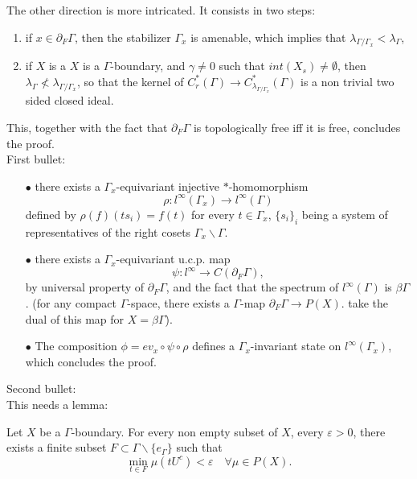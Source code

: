 The other direction is more intricated. It consists in two steps:\\
\begin{enumerate}
\item if $x\in \partial_F \Gamma$, then the stabilizer $\Gamma_x$ is amenable, which implies that $\lambda_{\Gamma/ \Gamma_x} <  \lambda_{\Gamma}$,\\
\item if $X$ is a $X$ is a $\Gamma$-boundary, and $\gamma\neq 0$ such that $int(X_s)\neq \emptyset$, then $\lambda_{\Gamma} \nless \lambda_{\Gamma/ \Gamma_x}  $, so that the kernel of $C^*_r(\Gamma)\rightarrow C^*_{\lambda_{\Gamma/ \Gamma_x}}(\Gamma)$ is a non trivial two sided closed ideal.\\
\end{enumerate}
This, together with the fact that $\partial_F\Gamma$ is topologically free iff it is free, concludes the proof.\\

First bullet: \\

\begin{itemize}
\item[$\bullet$] there exists a $\Gamma_x$-equivariant injective $*$-homomorphism
\[ \rho:  l^\infty (\Gamma_x ) \rightarrow l^\infty (\Gamma)\]
defined by $\rho(f)(ts_i)= f(t)$ for every $t\in\Gamma_x $, $\{s_i\}_i$ being a system of representatives of the right cosets $\Gamma_x \backslash \Gamma$.\\
\item[$\bullet$] there exists a $\Gamma_x$-equivariant u.c.p. map \[\psi : l^{\infty } \rightarrow C(\partial_F \Gamma),\] by universal property of $\partial_F \Gamma$, and the fact that the spectrum of $l^\infty(\Gamma)$ is $\beta \Gamma$. (for any compact $\Gamma$-space, there exists a $\Gamma$-map $\partial_F \Gamma \rightarrow P(X)$. take the dual of this map for $X = \beta \Gamma$).\\

\item[$\bullet$] The composition $\phi = ev_x \circ \psi \circ \rho$ defines a $\Gamma_x$-invariant state on $l^\infty(\Gamma_x)$, which concludes the proof.\\
\end{itemize}

Second bullet:\\

This needs a lemma:

\begin{lem} Let $X$ be a $\Gamma$-boundary.
For every non empty subset of $X$, every $\varepsilon >0$, there exists a finite subset $F\subset \Gamma \backslash \{e_\Gamma\}$ such that
\[ \min_{t\in F} \mu(tU^c) <\varepsilon \quad \forall \mu \in P(X).	 \]
\end{lem}

